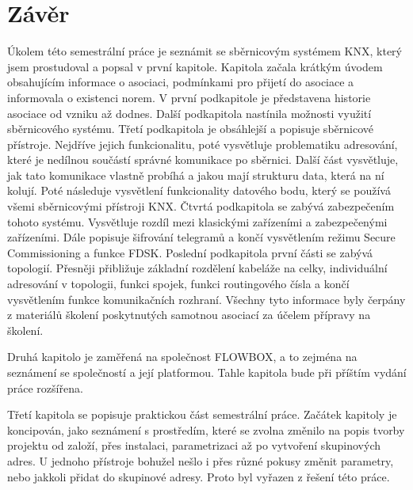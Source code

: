 \chapter*{Závěr}
{}

Úkolem této semestrální práce je seznámit se sběrnicovým systémem KNX, který jsem prostudoval a popsal v první kapitole. Kapitola začala krátkým úvodem obsahujícím informace o asociaci, podmínkami pro přijetí do asociace a informovala o existenci norem. V první podkapitole je představena historie asociace od vzniku až dodnes. Další podkapitola nastínila možnosti využití sběrnicového systému. Třetí podkapitola je obsáhlejší a popisuje sběrnicové přístroje. Nejdříve jejich funkcionalitu, poté vysvětluje problematiku adresování, které je nedílnou součástí správné komunikace po sběrnici. Další část vysvětluje, jak tato komunikace vlastně probíhá a jakou mají strukturu data, která na ní kolují. Poté následuje vysvětlení funkcionality datového bodu, který se používá všemi sběrnicovými přístroji KNX. Čtvrtá podkapitola se zabývá zabezpečením tohoto systému. Vysvětluje rozdíl mezi klasickými zařízeními a zabezpečenými zařízeními. Dále popisuje šifrování telegramů a končí vysvětlením režimu Secure Commissioning a funkce FDSK. Poslední podkapitola první části se zabývá topologií. Přesněji přibližuje základní rozdělení kabeláže na celky, individuální adresování v topologii, funkci spojek, funkci routingového čísla a končí vysvětlením funkce komunikačních rozhraní. Všechny tyto informace byly čerpány z materiálů školení poskytnutých samotnou asociací za účelem přípravy na školení.

Druhá kapitolo je zaměřená na společnost FLOWBOX, a to zejména na seznámení se společností a její platformou. Tahle kapitola bude při příštím vydání práce rozšířena.

Třetí kapitola se popisuje praktickou část semestrální práce. Začátek kapitoly je koncipován, jako seznámení s prostředím, které se zvolna změnilo na popis tvorby projektu od založí, přes instalaci, parametrizaci až po vytvoření skupinových adres. U jednoho přístroje bohužel nešlo i přes různé pokusy změnit parametry, nebo jakkoli přidat do skupinové adresy. Proto byl vyřazen z řešení této práce.